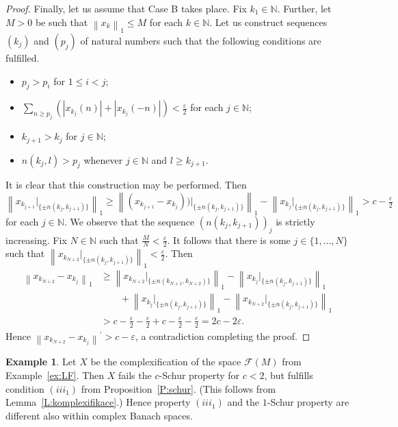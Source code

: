 \documentclass{amsart}
\numberwithin{equation}{section}
\theoremstyle{definition}
\newtheorem{example2}[thm]{Example}
\def\F{\mathcal F}
\def\ep{\varepsilon}
\def\en{\mathbb N}
\newcommand{\norm}[1]{\left\|#1\right\|}
\newcommand{\abs}[1]{\left|#1\right|}
\begin{document}
\begin{proof}
Finally, let us assume that Case B takes place. Fix  $k_1\in\en$. Further, let $M>0$ be such that $\norm{x_k}_1\le M$ for each $k\in\en$. Let us construct sequences $(k_j)$ and $(p_j)$ of natural numbers such that the following conditions are fulfilled.

\begin{itemize}
    \item $p_j>p_i$ for $1\le i<j$; 
    \item $\sum_{n\ge p_j}(\abs{x_{k_j}(n)}+\abs{x_{k_j}(-n)})<\frac\ep2$ for each $j\in \en$;
    \item $k_{j+1}>k_j$ for $j\in\en$;
    \item $n(k_j,l)>p_j$ whenever $j\in\en$ and $l\ge k_{j+1}$. 
\end{itemize}

It is clear that this construction may be performed. Then 
$$\norm{x_{k_{j+1}}|_{\{\pm n(k_j,k_{j+1})\}}}_1\ge \norm{(x_{k_{j+1}}-x_{k_j}))|_{\{\pm n(k_j,k_{j+1})\}}}_1-\norm{x_{k_{j}}|_{\{\pm n(k_j,k_{j+1})\}}}_1>c-\tfrac\ep2$$
for each $j\in\en$. We observe that the sequence $(n(k_j,k_{j+1}))_j$ is strictly increasing.
Fix $N\in\en$ such that $\frac MN<\frac\ep2$. It follows that there is some $j\in\{1,\dots,N\}$ such that
$\norm{x_{k_{N+2}}|_{\{\pm n(k_j,k_{j+1})\}}}_1<\frac\ep2$. Then
$$\begin{aligned}
   \norm{x_{k_{N+2}}-x_{k_j}}_1&\ge 
\norm{x_{k_{N+2}}|_{\{\pm n(k_{N+1},k_{N+2})\}}}_1-\norm{x_{k_{j}}|_{\{\pm n(k_j,k_{j+1})\}}}_1
\\&\qquad+\norm{x_{k_{j}}|_{\{\pm n(k_j,k_{j+1})\}}}_1-\norm{x_{k_{N+2}}|_{\{\pm n(k_j,k_{j+1})\}}}_1
\\&>c-\tfrac\ep2-\tfrac\ep2+c-\tfrac\ep2-\tfrac\ep2=2c-2\ep.\end{aligned}$$
Hence $\norm{x_{k_{N+2}}-x_{k_j}}^\prime>c-\ep$, a contradiction completing the proof. 
\end{proof}


\begin{example2}\label{ex:LF-complex}
Let $X$ be the complexification of the space $\F(M)$ from Example~\ref{ex:LF}. Then $X$ fails the $c$-Schur property for $c<2$, but fulfills condition $(iii_1)$ from Proposition~\ref{P:schur}. (This follows from Lemma~\ref{L:komplexifikace}.) Hence property $(iii_1)$ and the $1$-Schur property are different also within complex Banach spaces.
\end{example2}
\end{document}
